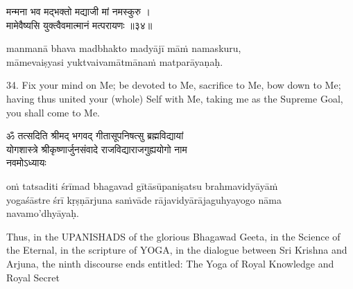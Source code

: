\begin{gitaverse}
मन्मना भव मद्भक्तो मद्याजी मां नमस्कुरु । \\
मामेवैष्यसि युक्त्वैवमात्मानं मत्परायणः ॥३४॥
\end{gitaverse}

\begin{transliteration}
manmanā bhava madbhakto madyājī māṁ namaskuru, \\
māmevaiṣyasi yuktvaivamātmānaṁ matparāyaṇaḥ.
\end{transliteration}

34. Fix your mind on Me; be devoted to Me, sacrifice to Me, bow down to Me;
having thus united your (whole) Self with Me, taking me as the Supreme Goal,
you shall come to Me.

\begin{gitaverse}
ॐ तत्सदिति श्रीमद् भगवद् गीतासूपनिषत्सु ब्रह्मविद्यायां \\
योगशास्त्रे श्रीकृष्णार्जुनसंवादे राजविद्याराजगुह्ययोगो नाम \\
नवमोऽध्यायः
\end{gitaverse}

\begin{transliteration}
oṁ tatsaditi śrīmad bhagavad gītāsūpaniṣatsu brahmavidyāyāṁ \\
yogaśāstre śrī kṛṣṇārjuna saṁvāde rājavidyārājaguhyayogo nāma \\
navamo'dhyāyaḥ.
\end{transliteration}

Thus, in the UPANISHADS of the glorious Bhagawad Geeta, in the Science of the
Eternal, in the scripture of YOGA, in the dialogue between Sri Krishna and
Arjuna, the ninth discourse ends entitled: The Yoga of Royal Knowledge and
Royal Secret
